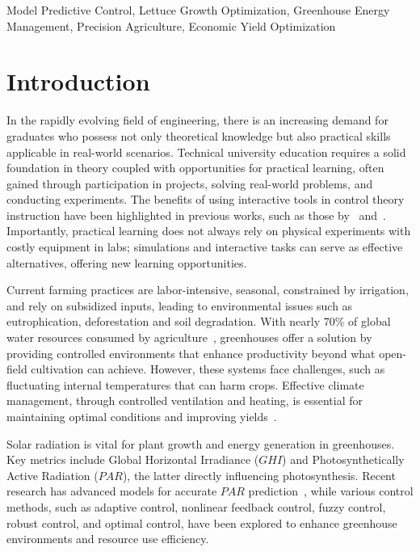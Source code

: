 \documentclass[conference]{IEEEtran}
\begin{document}
\begin{IEEEkeywords}
    Model Predictive Control, Lettuce Growth Optimization, Greenhouse Energy Management, Precision Agriculture, Economic Yield Optimization
\end{IEEEkeywords}

\section{Introduction}

In the rapidly evolving field of engineering, there is an increasing demand for graduates who possess not only theoretical knowledge but also practical skills applicable in real-world scenarios. Technical university education requires a solid foundation in theory coupled with opportunities for practical learning, often gained through participation in projects, solving real-world problems, and conducting experiments. The benefits of using interactive tools in control theory instruction have been highlighted in previous works, such as those by~\cite{Emami1991} and~\cite{Guzman2013}. Importantly, practical learning does not always rely on physical experiments with costly equipment in labs; simulations and interactive tasks can serve as effective alternatives, offering new learning opportunities.

Current farming practices are labor-intensive, seasonal, constrained by irrigation, and rely on subsidized inputs, leading to environmental issues such as eutrophication, deforestation and soil degradation. With nearly 70\% of global water resources consumed by agriculture~\cite{Debroy2024}, greenhouses offer a solution by providing controlled environments that enhance productivity beyond what open-field cultivation can achieve. However, these systems face challenges, such as fluctuating internal temperatures that can harm crops. Effective climate management, through controlled ventilation and heating, is essential for maintaining optimal conditions and improving yields~\cite{Wu2019}.

Solar radiation is vital for plant growth and energy generation in greenhouses. Key metrics include Global Horizontal Irradiance (\(GHI\)) and Photosynthetically Active Radiation (\(PAR\)), the latter directly influencing photosynthesis. Recent research has advanced models for accurate \(PAR\) prediction~\cite{Iddio2020, MaLu2022}, while various control methods, such as adaptive control, nonlinear feedback control, fuzzy control, robust control, and optimal control, have been explored to enhance greenhouse environments and resource use efficiency.
\end{document}
